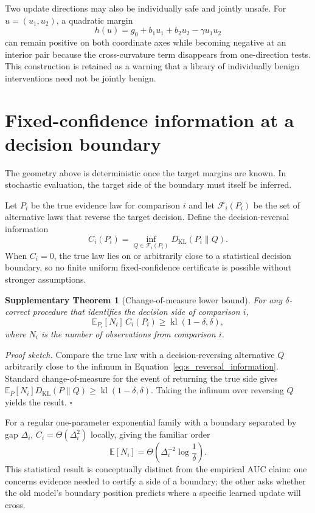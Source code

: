 \documentclass[11pt,letterpaper]{article}
\theoremstyle{plain}
\newtheorem{theorem}{Supplementary Theorem}
\newcommand{\1}{\mathbf 1}
\begin{document}
Two update directions may also be individually safe and jointly unsafe. For $u=(u_1,u_2)$, a quadratic margin
\begin{equation}
 h(u)=g_0+b_1u_1+b_2u_2-\gamma u_1u_2
\label{eq:s_cross_curvature}
\end{equation}
can remain positive on both coordinate axes while becoming negative at an interior pair because the cross-curvature term disappears from one-direction tests. This construction is retained as a warning that a library of individually benign interventions need not be jointly benign.

\section{Fixed-confidence information at a decision boundary}
The geometry above is deterministic once the target margins are known. In stochastic evaluation, the target side of the boundary must itself be inferred.

Let $P_i$ be the true evidence law for comparison $i$ and let $\mathcal F_i(P_i)$ be the set of alternative laws that reverse the target decision. Define the decision-reversal information
\begin{equation}
 C_i(P_i)=\inf_{Q\in\mathcal F_i(P_i)}D_{\mathrm{KL}}(P_i\|Q).
\label{eq:s_reversal_information}
\end{equation}
When $C_i=0$, the true law lies on or arbitrarily close to a statistical decision boundary, so no finite uniform fixed-confidence certificate is possible without stronger assumptions.

\begin{theorem}[Change-of-measure lower bound]
For any $\delta$-correct procedure that identifies the decision side of comparison $i$,
\begin{equation}
 \mathbb E_{P_i}[N_i]\, C_i(P_i)\ge \operatorname{kl}(1-\delta,\delta),
\label{eq:s_kl_lower}
\end{equation}
where $N_i$ is the number of observations from comparison $i$.
\end{theorem}
\textit{Proof sketch.} Compare the true law with a decision-reversing alternative $Q$ arbitrarily close to the infimum in Equation~\ref{eq:s_reversal_information}. Standard change-of-measure for the event of returning the true side gives $\mathbb E_P[N_i]D_{\mathrm{KL}}(P\|Q)\ge\operatorname{kl}(1-\delta,\delta)$. Taking the infimum over reversing $Q$ yields the result. $\square$

For a regular one-parameter exponential family with a boundary separated by gap $\Delta_i$, $C_i=\Theta(\Delta_i^2)$ locally, giving the familiar order
\begin{equation}
 \mathbb E[N_i]=\Theta\!\left(\Delta_i^{-2}\log\frac1\delta\right).
\label{eq:s_inverse_square}
\end{equation}
This statistical result is conceptually distinct from the empirical AUC claim: one concerns evidence needed to certify a side of a boundary; the other asks whether the old model's boundary position predicts where a specific learned update will cross.
\end{document}
